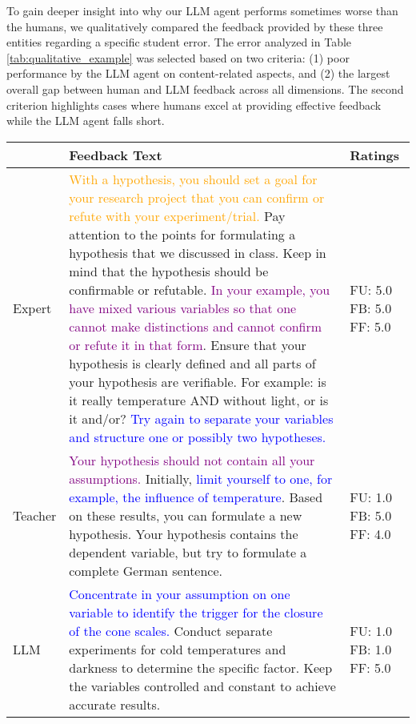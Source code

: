 To gain deeper insight into why our LLM agent performs sometimes worse than the humans, we qualitatively compared the feedback provided by these three entities regarding a specific student error. The error analyzed in Table \ref{tab:qualitative_example} was selected based on two criteria: (1) poor performance by the LLM agent on content-related aspects, and (2) the largest overall gap between human and LLM feedback across all dimensions. The second criterion highlights cases where humans excel at providing effective feedback while the LLM agent falls short.


\newcommand{\feedup}[1]{\textcolor{orange}{#1}}
\newcommand{\feedback}[1]{\textcolor{purple}{#1}}
\newcommand{\feedforward}[1]{\textcolor{blue}{#1}}


\begin{table}[htbp]
    \centering
    
\begin{tabular}{p{1cm}p{8.3cm}P{1.2cm}} %
\toprule
\textbf{} & \textbf{Feedback Text} & \textbf{Ratings} \\ \midrule
Expert         & \feedup{With a hypothesis, you should set a goal for your research project that you can confirm or refute with your experiment/trial.} Pay attention to the points for formulating a hypothesis that we discussed in class. Keep in mind that the hypothesis should be confirmable or refutable. \feedback{In your example, you have mixed various variables so that one cannot make distinctions and cannot confirm or refute it in that form}. Ensure that your hypothesis is clearly defined and all parts of your hypothesis are verifiable. For example: is it really temperature AND without light, or is it and/or? \feedforward{Try again to separate your variables and structure one or possibly two hypotheses.}   & FU: 5.0 FB: 5.0 FF: 5.0     \\  %
Teacher      & \feedback{Your hypothesis should not contain all your assumptions.} Initially, \feedforward{limit yourself to one, for example, the influence of temperature}. Based on these results, you can formulate a new hypothesis. Your hypothesis contains the dependent variable, but try to formulate a complete German sentence.      & FU: 1.0 FB: 5.0 FF: 4.0    \\ %
LLM     & \feedforward{Concentrate in your assumption on one variable to identify the trigger for the closure of the cone scales.} Conduct separate experiments for cold temperatures and darkness to determine the specific factor. Keep the variables controlled and constant to achieve accurate results.     & FU: 1.0 FB: 1.0 FF: 5.0         \\ \bottomrule %
\end{tabular}


\end{table}
